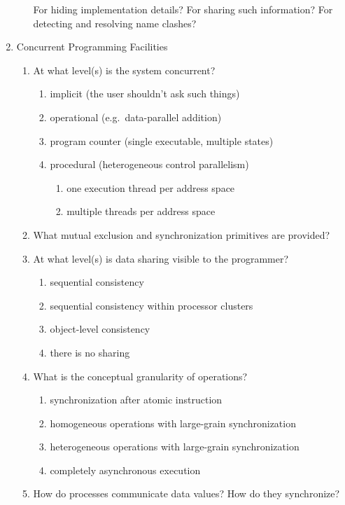 \begin{enumerate}
\begin{enumerate}
	For hiding implementation details?
	For sharing such information?
	For detecting and resolving name clashes?
  \end{enumerate}
\item Concurrent Programming Facilities
  \begin{enumerate}
  \item At what level(s) is the system concurrent?
    \begin{enumerate}
    \item implicit (the user shouldn't ask such things)
    \item operational (e.g.\ data-parallel addition)
    \item program counter (single executable, multiple states)
    \item procedural (heterogeneous control parallelism)
      \begin{enumerate}
      \item one execution thread per address space
      \item multiple threads per address space
      \end{enumerate}
    \end{enumerate}
  \item What mutual exclusion and synchronization primitives are provided?
  \item At what level(s) is data sharing visible to the programmer?
    \begin{enumerate}
    \item sequential consistency
    \item sequential consistency within processor clusters
    \item object-level consistency
    \item there is no sharing
    \end{enumerate}
  \item What is the conceptual granularity of operations?
    \begin{enumerate}
    \item synchronization after atomic instruction
    \item homogeneous operations with large-grain synchronization
    \item heterogeneous operations with large-grain synchronization
    \item completely asynchronous execution
    \end{enumerate}
  \item How do processes communicate data values?
	How do they synchronize?

\end{enumerate}
\end{enumerate}

